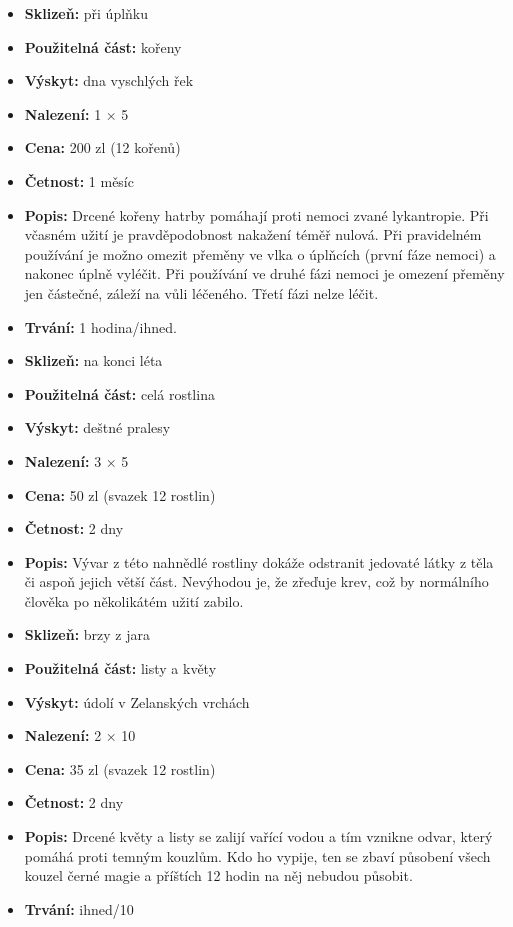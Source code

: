 \documentclass[../main.tex]{subfiles}
\begin{document}
\begin{predmet}
\begin{itemize}
	\item \textbf{Sklizeň:} při úplňku
	\item \textbf{Použitelná část:} kořeny
	\item \textbf{Výskyt:} dna vyschlých řek
	\item \textbf{Nalezení:} 1 × 5
	\item \textbf{Cena:} 200 zl (12 kořenů)
	\item \textbf{Četnost:} 1 měsíc
	\item \textbf{Popis:} Drcené kořeny hatrby pomáhají proti nemoci zvané lykantropie. Při včasném užití je pravděpodobnost nakažení téměř nulová. Při pravidelném používání je možno omezit přeměny ve vlka o úplňcích (první fáze nemoci) a nakonec úplně vyléčit. Při používání ve druhé fázi nemoci je omezení přeměny jen částečné, záleží na vůli léčeného. Třetí fázi nelze léčit.
	\item \textbf{Trvání:} 1 hodina/ihned.
\end{itemize}
\end{predmet}

\begin{predmet}
\begin{itemize}
	\item \textbf{Sklizeň:} na konci léta
	\item \textbf{Použitelná část:} celá rostlina
	\item \textbf{Výskyt:} deštné pralesy
	\item \textbf{Nalezení:} 3 × 5
	\item \textbf{Cena:} 50 zl (svazek 12 rostlin)
	\item \textbf{Četnost:} 2 dny
	\item \textbf{Popis:} Vývar z této nahnědlé rostliny dokáže odstranit jedovaté látky z těla či aspoň jejich větší část. Nevýhodou je, že zřeďuje krev, což by normálního člověka po několikátém užití zabilo.
\end{itemize}
\end{predmet}

\begin{predmet}
\begin{itemize}
	\item \textbf{Sklizeň:} brzy z jara
	\item \textbf{Použitelná část:} listy a květy
	\item \textbf{Výskyt:} údolí v Zelanských vrchách
	\item \textbf{Nalezení:} 2 × 10
	\item \textbf{Cena:} 35 zl (svazek 12 rostlin)
	\item \textbf{Četnost:} 2 dny
	\item \textbf{Popis:} Drcené květy a listy se zalijí vařící vodou a tím vznikne odvar, který pomáhá proti temným kouzlům. Kdo ho vypije, ten se zbaví působení všech kouzel černé magie a příštích 12 hodin na něj nebudou působit.
	\item \textbf{Trvání:} ihned/10
\end{itemize}
\end{predmet}
\end{document}
